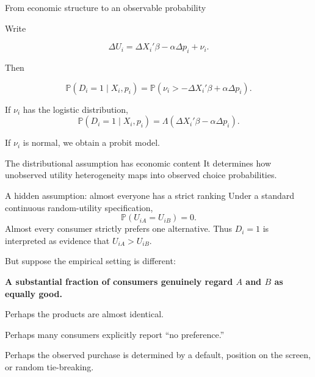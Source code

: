 \documentclass[aspectratio=169,11pt]{beamer}
\newcommand{\Pp}{\mathbb{P}}
\begin{document}
\begin{frame}{From economic structure to an observable probability}

Write

\[
\Delta U_i
=
\Delta X_i'\beta
-
\alpha\Delta p_i
+
\nu_i.
\]

Then

\[
\Pp(D_i=1\mid X_i,p_i)
=
\Pp
\left(
\nu_i
>
-\Delta X_i'\beta+\alpha\Delta p_i
\right).
\]

If $\nu_i$ has the logistic distribution,
\[
\boxed{
\Pp(D_i=1\mid X_i,p_i)
=
\Lambda
\left(
\Delta X_i'\beta-\alpha\Delta p_i
\right).
}
\]

If $\nu_i$ is normal, we obtain a probit model.

\vspace{0.4em}

\begin{alertblock}{The distributional assumption has economic content}
It determines how unobserved utility heterogeneity maps into observed
choice probabilities.
\end{alertblock}

\end{frame}

\begin{frame}{A hidden assumption: almost everyone has a strict ranking}
Under a standard continuous random-utility specification,
\[
\Pp(U_{iA}=U_{iB})=0.
\]
Almost every consumer strictly prefers one alternative. Thus $D_i=1$ is
interpreted as evidence that $U_{iA}>U_{iB}$.

\vspace{0.3em}

But suppose the empirical setting is different:
\begin{center}
\textbf{A substantial fraction of consumers genuinely regard
$A$ and $B$ as equally good.}
\end{center}

Perhaps the products are almost identical.

Perhaps many consumers explicitly report ``no preference.''

Perhaps the observed purchase is determined by a default,
position on the screen, or random tie-breaking.
\end{frame}
\end{document}
